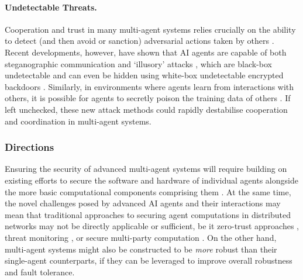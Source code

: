 \paragraph{Undetectable Threats.}
Cooperation and trust in many multi-agent systems relies crucially on the ability to detect (and then avoid or sanction) adversarial actions taken by others \citep{schneier_liars_2012,Ostrom1990}.
Recent developments, however, have shown that AI agents are capable of both steganographic communication \citep{SchroederdeWitt2023,motwani2024secret} and `illusory' attacks \citep{franzmeyer_illusory_2023}, which are black-box undetectable and can even be hidden using white-box undetectable encrypted backdoors \citep{draguns_unelicitable_2024}.
Similarly, in environments where agents learn from interactions with others, it is possible for agents to secretly poison the training data of others \citep{halawi2024covert,wei2023jailbroken}.
If left unchecked, these new attack methods could rapidly destabilise cooperation and coordination in multi-agent systems.

\subsubsection{Directions}

Ensuring the security of advanced multi-agent systems will require building on existing efforts to secure the software and hardware of individual agents alongside the more basic computational components comprising them \citep{he2024securityaiagents}.
At the same time, the novel challenges posed by advanced AI agents and their interactions may mean that traditional approaches to securing agent computations in distributed networks may not be directly applicable or sufficient, be it zero-trust approaches \citep{wylde_zero_2021}, threat monitoring \citep{liao_intrusion_2013}, or secure multi-party computation \citep{yao_protocols_1982}. 
On the other hand, multi-agent systems might also be constructed to be \textit{more} robust than their single-agent counterparts, if they can be leveraged to improve overall robustness and fault tolerance.


